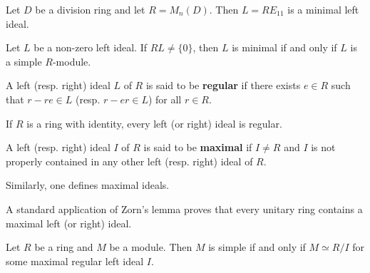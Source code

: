 \begin{example}
	Let $D$ be a division ring and let $R=M_n(D)$. Then $L=RE_{11}$ 
	is a minimal left ideal.
\end{example}

\begin{example}
	Let $L$ be a non-zero left ideal. If $RL\ne\{0\}$, then
	$L$ is minimal if and only if $L$ is a simple $R$-module. 
\end{example}

\begin{definition}
A left (resp. right) ideal $L$ of $R$ is said to be \textbf{regular} if
there exists $e\in R$ such that $r-re\in L$ (resp.  $r-er\in L$) for all $r\in R$.
\end{definition}

If $R$ is a ring with identity, every left (or right) ideal is regular. 

\begin{definition}
A left (resp. right) ideal $I$ of $R$ is said to be \textbf{maximal} if $I\ne R$ and $I$ is not properly contained 
in any other left (resp. right) ideal of $R$. 
\end{definition}

Similarly, one defines maximal ideals. 

A standard application of Zorn's lemma proves 
that every unitary ring contains a maximal left (or right) ideal.  

\begin{proposition}
	\label{proposition:R/I}
	Let $R$ be a ring and $M$ be a module. Then $M$ is simple if and only if
	$M\simeq R/I$ for some maximal regular left ideal $I$. 	
\end{proposition}

